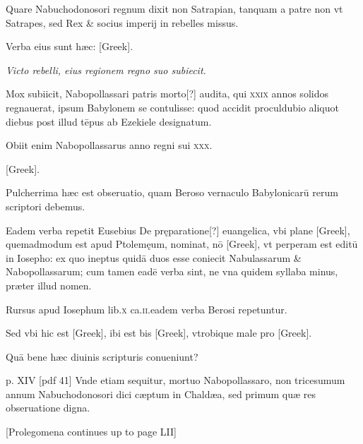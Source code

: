 \begin{parnumbers}
Quare Nabuchodonosori regnum
dixit non Satrapian, tanquam a patre non vt Satrapes, sed Rex
\& socius imperij in rebelles missus.

Verba eius sunt hæc: \textgreek{[Greek]}.

\textit{Victo rebelli, eius regionem regno suo subiecit.}

Mox subiicit, Nabopollassari patris morto[?]
audita, qui \textsc{xxix} annos solidos regnauerat, ipsum Babylonem se
contulisse: quod accidit proculdubio aliquot diebus post illud tēpus
ab Ezekiele designatum.

Obiit enim Nabopollassarus anno regni
sui \textsc{xxx}.

\textgreek{[Greek]}.

Pulcherrima hæc est obseruatio, quam Beroso vernaculo
Babylonicarū rerum scriptori debemus.

Eadem verba repetit Eusebius De pręparatione[?] euangelica, vbi plane \textgreek{[Greek]}, quemadmodum
est apud Ptolemęum, nominat, nō \textgreek{[Greek]}, vt perperam
est editū in Iosepho: ex quo ineptus quidā duos esse coniecit
Nabulassarum \& Nabopollassarum; cum tamen eadē verba sint, ne
vna quidem syllaba minus, præter illud nomen.

Rursus apud Iosephum
lib.\textsc{x} ca.\textsc{ii}.eadem verba Berosi repetuntur.

Sed vbi hic est \textgreek{[Greek]},
ibi est bis \textgreek{[Greek]}, vtrobique male pro \textgreek{[Greek]}.

Quā bene hæc diuinis scripturis conueniunt?

\clearpage
p. XIV [pdf 41]
Vnde etiam sequitur, mortuo Nabopollassaro, non tricesumum annum Nabuchodonosori
dici cæptum in Chaldæa, sed primum quæ res obseruatione
digna.

[Prolegomena continues up to page LII]

\end{parnumbers}
